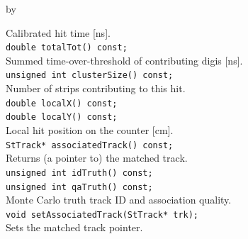 \documentclass[twoside]{article}
\newcommand{\entrylabel}[1]{\mbox{\textbf{{#1}}}\hfil}%
\newenvironment{entry}
{\begin{list}{}%
    {\renewcommand{\makelabel}{\entrylabel}%
     \setlength{\labelwidth}{90pt}%
     \setlength{\leftmargin}{\labelwidth}
     \advance\leftmargin by \labelsep%
      }%
    }%
  {\end{list}}
\newcommand{\Entrylabel}[1]%
{\raisebox{0pt}[1ex][0pt]{\makebox[\labelwidth][l]%
    {\parbox[t]{\labelwidth}{\hspace{0pt}\textbf{{#1}}}}}}
\newenvironment{Entry}%
{\renewcommand{\entrylabel}{\Entrylabel}\begin{entry}}%
  {\end{entry}}
\begin{document}
\begin{Entry}
    Calibrated hit time [ns].\\
    \verb+double totalTot() const;+\\
    Summed time-over-threshold of contributing digis [ns].\\
    \verb+unsigned int clusterSize() const;+\\
    Number of strips contributing to this hit.\\
    \verb+double localX() const;+\\
    \verb+double localY() const;+\\
    Local hit position on the counter [cm].\\
    \verb+StTrack* associatedTrack() const;+\\
    Returns (a pointer to) the matched track.\\
    \verb+unsigned int idTruth() const;+\\
    \verb+unsigned int qaTruth() const;+\\
    Monte Carlo truth track ID and association quality.\\
    \verb+void setAssociatedTrack(StTrack* trk);+\\
    Sets the matched track pointer.\\
\end{Entry}
\clearpage

\end{document}
